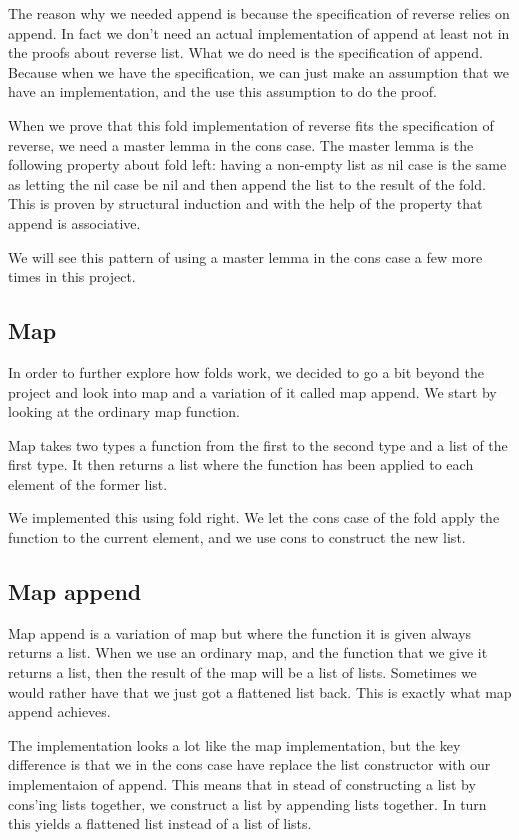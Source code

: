 \documentclass[a4paper]{article}
\begin{document}
The reason why we needed append is because the specification of reverse
relies on append. In fact we don't need an actual implementation of append at
least not in the proofs about reverse list. What we do need is the specification
of append. Because when we have the specification, we can just make an
assumption that we have an implementation, and the use this assumption to do the
proof.

When we prove that this fold implementation of reverse fits the specification
of reverse, we need a master lemma in the cons case. The master lemma is the
following property about fold left: having a non-empty list as nil case is the
same as letting the nil case be nil and then append the list to the result of
the fold. This is proven by structural induction and with the help of the
property that append is associative.

We will see this pattern of using a master lemma in the cons case a few more
times in this project.

\subsection{Map}
In order to further explore how folds work, we decided to go a bit beyond the
project and look into map and a variation of it called map append.
We start by looking at the ordinary map function.

Map takes two
types a function from the first to the second type and a list of the first type.
It then returns a list where the function has been applied to each element of
the former list.

We implemented this using fold right. We let the cons case of the fold apply the
function to the current element, and we use cons to construct the new list.

\subsection{Map append}
Map append is a variation of map but where the function it is given always
returns a list. When we use an ordinary map, and the function that we give it
returns a list, then the result of the map will be a list of lists. Sometimes
we would rather have that we just got a flattened list back. This is exactly
what map append achieves.

The implementation looks a lot like the map implementation, but the key
difference is that we in the cons case have replace the list constructor with
our implementaion of append. This means that in stead of constructing a list
by cons'ing lists together, we construct a list by appending lists together.
In turn this yields a flattened list instead of a list of lists.
\end{document}
